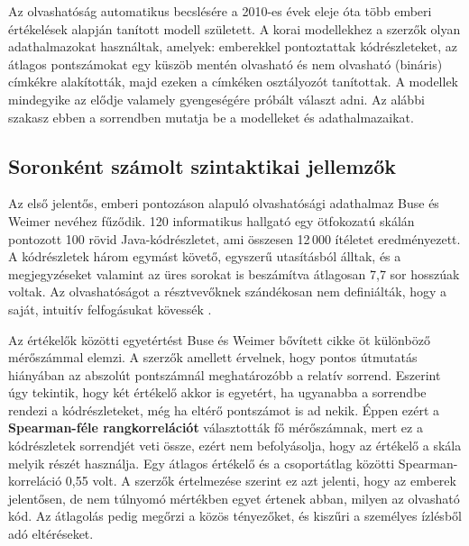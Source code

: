 \documentclass[
]{elteikthesis}[2024/04/26]
\begin{document}
Az olvashatóság automatikus becslésére a 2010-es évek eleje óta több
emberi értékelések alapján tanított modell született. A korai modellekhez a
szerzők olyan adathalmazokat használtak, amelyek: %
emberekkel pontoztattak kódrészleteket, az átlagos pontszámokat egy küszöb
mentén olvasható és nem olvasható (bináris) címkékre alakították, majd ezeken a
címkéken osztályozót tanítottak. A modellek mindegyike az elődje valamely
gyengeségére próbált választ adni. Az alábbi szakasz ebben a sorrendben mutatja
be a modelleket és adathalmazaikat.

\subsection{Soronként számolt szintaktikai jellemzők}
\label{sec:related:models:buse}

Az első jelentős, emberi pontozáson alapuló olvashatósági adathalmaz Buse és %
Weimer nevéhez fűződik. 120 informatikus hallgató egy ötfokozatú skálán
pontozott 100 rövid Java-kódrészletet, ami összesen 12\,000 ítéletet
eredményezett. A kódrészletek három egymást követő, egyszerű utasításból álltak,
és a megjegyzéseket valamint az üres sorokat is beszámítva átlagosan 7,7 sor
hosszúak voltak. Az olvashatóságot a résztvevőknek szándékosan nem definiálták,
hogy a saját, intuitív felfogásukat kövessék \cite{buse2008metric}.

Az értékelők közötti egyetértést Buse és Weimer bővített cikke öt különböző
mérőszámmal elemzi. A szerzők amellett érvelnek, hogy pontos útmutatás hiányában
az abszolút pontszámnál meghatározóbb a relatív sorrend. Eszerint úgy tekintik,
hogy két értékelő %
akkor is egyetért, ha ugyanabba a sorrendbe rendezi a kódrészleteket, még ha
eltérő pontszámot is ad nekik. Éppen ezért a \textbf{Spearman-féle
rangkorrelációt} választották fő mérőszámnak, mert ez a kódrészletek sorrendjét
veti össze, ezért nem befolyásolja, hogy az értékelő a skála melyik részét
használja. Egy átlagos értékelő és a csoportátlag közötti Spearman-korreláció
0,55 volt. A szerzők értelmezése szerint ez azt jelenti, hogy az emberek
jelentősen, de nem túlnyomó mértékben egyet értenek abban, milyen az olvasható
kód. Az átlagolás pedig megőrzi a közös tényezőket, és kiszűri a személyes
ízlésből adó eltéréseket. %
\end{document}
